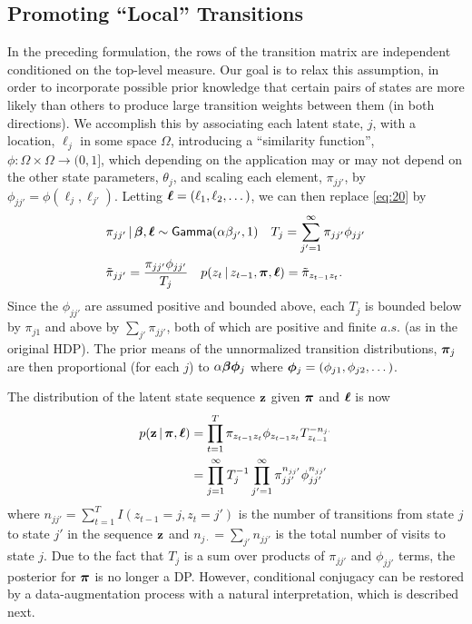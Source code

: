 \subsection{Promoting ``Local'' Transitions}
\label{sec:prom-local-trans}

In the preceding formulation, the rows of the transition matrix 
are independent conditioned on the top-level measure.  Our goal is to relax this
assumption, in order to incorporate possible prior knowledge
that certain pairs of states are more likely than others to
produce large transition weights between them (in both directions).  
We accomplish this by associating each latent state, $j$, with a location,
$\ell_j$ in some space $\Omega$, introducing a ``similarity function'', $\phi: \Omega
\times \Omega \to (0,1]$, which depending on the application 
may or may not depend on the other state parameters,
$\theta_j$, and scaling each element,
$\pi_{jj'}$, by $\phi_{jj'} = \phi(\ell_{j}, \ell_{j'})$.
Letting $\boldsymbol{\ell} = (\ell_1, \ell_2, \dots)$, we can then replace \eqref{eq:20} by
\begin{align}
\begin{split}
  &\pi_{jj'} \, \vert \, \boldsymbol{\beta}, \boldsymbol{\ell} \sim \mathsf{Gamma}(\alpha
    \beta_{j'},1) \quad
  T_j = \sum_{j'=1}^{\infty} \pi_{jj'}\phi_{jj'} \\
&\tilde{\pi}_{jj'} = \frac{\pi_{jj'}\phi_{jj'}}{T_j} \quad p(z_t \, \vert \,
z_{t-1}, \boldsymbol{\pi}, \boldsymbol{\ell}) = \tilde{\pi}_{z_{t-1}z_t}.
\end{split}
\end{align}
Since the $\phi_{jj'}$ are assumed positive and
bounded above, each $T_j$ is bounded below by $\pi_{j1}$
and above by $\sum_{j'} \pi_{jj'}$, both of which are positive and
finite $a.s.$ (as in the original HDP). The prior means of the
unnormalized transition distributions, $\boldsymbol{\pi}_j$ are then 
proportional (for each $j$) to $\alpha\boldsymbol{\beta}\boldsymbol{\phi}_{j}$ where $\boldsymbol{\phi}_j
= (\phi_{j1}, \phi_{j2}, \dots)$.

The distribution of the latent state sequence
$\mathbf{z}$ given $\boldsymbol{\pi}$ and $\boldsymbol{\ell}$ is now
\begin{align}
\begin{split}
  p(\mathbf{z} \, \vert \, \boldsymbol{\pi}, \boldsymbol{\ell}) &= \prod_{t=1}^T \pi_{z_{t-1}z_t}
  \phi_{z_{t-1}z_t} T_{z_{t-1}}^{-n_{j\cdot}} \\
  &= \prod_{j=1}^\infty T_j^{-1} \prod_{j'=1}^{\infty}
  \pi_{jj'}^{n_{jj'}} \phi_{jj'}^{n_{jj'}}
\end{split}
\end{align}
where $n_{jj'} = \sum_{t=1}^T I(z_{t-1} = j, z_{t} = j')$ is the
number of transitions from state $j$ to state $j'$ in the sequence
$\mathbf{z}$ and $n_{j\cdot} = \sum_{j'} n_{jj'}$ is the total number of
visits to state $j$.  Due to the fact that $T_j$ is a sum over products of
$\pi_{jj'}$ and $\phi_{jj'}$ terms, the posterior for
$\boldsymbol{\pi}$ is no longer a DP.  However, conditional conjugacy can be
restored by a data-augmentation process with a natural interpretation, 
which is described next.

